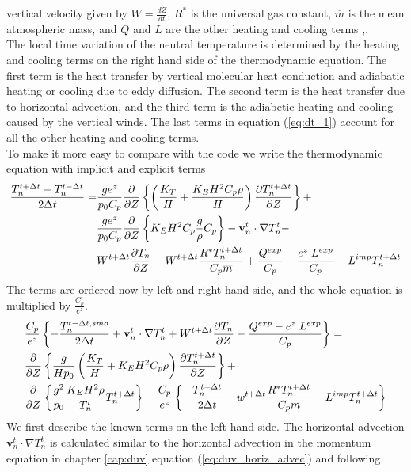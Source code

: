 vertical velocity given by $W = \frac{dZ}{dt}$, $R^*$ is the
universal gas constant, $\overline{m}$ is the mean atmospheric mass,
and $Q$
and $L$ are the other heating and cooling terms
\cite{roble1995},\cite{roble1987b}. \\
%
The local time variation of the neutral temperature is determined by
the heating and cooling terms on the right hand side of the
thermodynamic equation. The first term is the heat transfer by
vertical molecular heat conduction and adiabatic heating or cooling
due to eddy diffusion. The second term is the heat transfer due to
horizontal advection, and the third term is the adiabetic heating
and cooling caused by the vertical winds. The last terms in equation 
(\ref{eq:dt_1}) account
for all the other heating and cooling terms. \\

%
To make it more easy to compare with the code we write the
thermodynamic equation with implicit and explicit terms
%
\begin{align}
  \frac{T_n^{t+\Delta t}- T_n^{t- \Delta t}}{2 \Delta t} =&
   \frac{g e^z}{p_0 C_p}\frac{\partial}{\partial Z}
  \left\{ \left( \frac{K_T}{H} + \frac{K_E H^2 C_p \rho}{H} \right)
  \frac{\partial T_n^{t+\Delta t}}{\partial Z}\right\} + \notag \\
  {}& \frac{g e^z}{p_0 C_p}\frac{\partial}{\partial Z}
  \left\{K_E H^2 C_p
   \frac{g} \rho {C_p}\right\} - \mathbf{v}_n^t\cdot \nabla T_n^t - \\
   {}& W^{t+\Delta t}\frac{\partial T_n}{\partial Z}
    - W^{t+\Delta t}\frac{R^* T_n^{t+\Delta t}}{C_p \overline{m}}
    + \frac{Q^{exp}}{C_p}- \frac{e^z \; L^{exp}}{C_p}- L^{imp} T_n^{t + \Delta t}
    \notag
\end{align}
%
The terms are ordered now by left and right hand side, and the whole
equation is multiplied by $\frac{C_p}{e^z}$.
%
\begin{align}
  & \frac{C_p}{e^z} \left\{ -\frac{T_n^{t- \Delta t,smo}}{2 \Delta t} +
  \mathbf{v}_n^t\cdot \nabla T_n^t + W^{t+\Delta t}\frac{\partial T_n}{\partial Z}
  - \frac{Q^{exp}-e^z \; L^{exp}}{C_p} \right\} = \notag \\
  & \frac{\partial}{\partial Z} \left\{
  \frac{g}{H p_0} \left( \frac{K_T}{H} + K_E H^2 C_p \rho \right)
  \frac{\partial T_n^{t+\Delta t}}{\partial Z}
  \right\} + \\
  & \frac{\partial}{\partial Z} \left\{ \frac{g^2}{p_0}\frac{K_E H^2 \rho}
  {T_n^t} T_n^{t+\Delta t} \right\}
  + \frac{C_p}{e^z}\left\{ - \frac{T_n^{t+ \Delta t}}{2 \Delta t} - w^{t+\Delta t}
  \frac{R^* T_n^{t+\Delta t}}{C_p \overline{m}} - L^{imp} T_n^{t + \Delta t}
\right\} \notag
\end{align}
%
We first describe the known terms on the left hand side. The
horizontal advection $\mathbf{v}_n^t\cdot \nabla T_n^t$ is
calculated similar to the horizontal advection in the momentum
equation in chapter \ref{cap:duv} equation
(\ref{eq:duv_horiz_advec})
and following. \\

